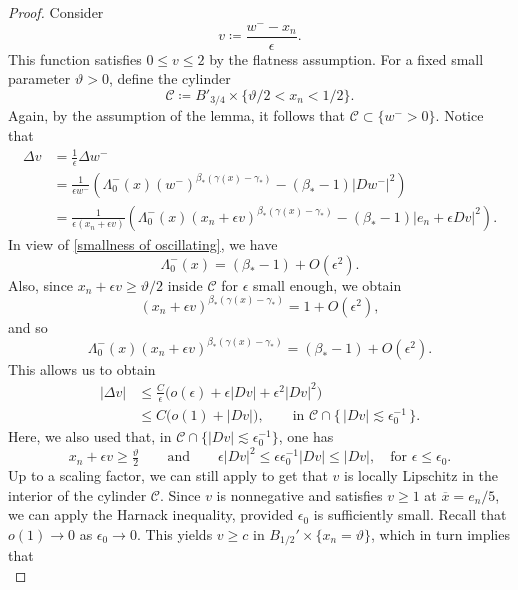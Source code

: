 \documentclass[reqno,11pt]{amsart}
\newcommand{\1}{\mathds{1}}
\numberwithin{equation}{section}
\begin{document}
\begin{proof}
Consider
$$
    v \coloneqq \frac{w^- - x_n}{\epsilon}.
$$
This function satisfies $0 \leq v \leq 2$ by the flatness assumption. For a fixed small parameter $\vartheta>0$, define the cylinder
$$
    \mathcal{C} \coloneqq B'_{3/4} \times \{\vartheta/2 < x_n < 1/2 \}.
$$
Again, by the assumption of the lemma, it follows that $\mathcal{C} \subset \{w^->0 \}$. Notice that
\begin{align*}
    \Delta v & = \frac{1}{\epsilon} \Delta w^-\\
             & = \frac{1}{\epsilon w^-}\left(\Lambda^-_{0}(x)(w^-)^{\beta_\ast(\gamma(x)-\gamma_\ast)} - (\beta_\ast - 1)|Dw^-|^2 \right)\\
             & = \frac{1}{\epsilon (x_n + \epsilon v)}\left(\Lambda^-_{0}(x)(x_n + \epsilon v)^{\beta_\ast(\gamma(x)-\gamma_\ast)} - (\beta_\ast - 1)|e_n + \epsilon Dv|^2 \right).
\end{align*}
In view of \eqref{smallness of oscillating}, we have
$$
    \Lambda_0^-(x) = (\beta_\ast - 1) + O(\epsilon^2).
$$
Also, since $x_n + \epsilon v \geq \vartheta/2$ inside $\mathcal{C}$ for $\epsilon$ small enough, we obtain
$$
    (x_n + \epsilon v)^{\beta_\ast(\gamma(x)-\gamma_\ast)} = 1+ O(\epsilon^2),
$$
and so
$$
    \Lambda^-_{0}(x)(x_n + \epsilon v)^{\beta_\ast(\gamma(x)-\gamma_\ast)} =(\beta_\ast - 1) + O(\epsilon^2).
$$
This allows us to obtain
\[
\begin{aligned}
|\Delta v|
&\leq \frac{C}{\epsilon}\Big(o(\epsilon) + \epsilon |Dv| + \epsilon^2 |Dv|^2 \Big) \\
&\leq C\big(o(1) + |Dv|\big),
\qquad \text{in } \mathcal{C} \cap \{\,|Dv| \lesssim \epsilon_0^{-1}\,\}.
\end{aligned}
\]
Here, we also used that, in $\mathcal{C} \cap \{|Dv| \lesssim \epsilon_0^{-1}\}$, one has
\[
x_n + \epsilon v \geq \tfrac{\vartheta}{2}
\qquad \text{and} \qquad 
\epsilon |Dv|^2 \leq \epsilon \epsilon_0^{-1} |Dv| \leq |Dv|,
\quad \text{for } \epsilon \leq \epsilon_0.
\] 
Up to a scaling factor, we can still apply \cite[Lemma 3.8]{DSS} to get that $v$ is locally Lipschitz in the interior of the cylinder $\mathcal{C}$. Since $v$ is nonnegative and satisfies $v \geq 1$ at $\overline{x} = e_n/5$, we can apply the Harnack inequality, provided $\epsilon_0$ is sufficiently small. Recall that $o(1) \to 0$ as $\epsilon_0 \to 0$. This yields $v \geq c$ in $B_{1/2}' \times \{x_n = \vartheta\}$, which in turn implies that 
\begin{equation}\label{bound from below harnack}

\end{equation}
\end{proof}
\end{document}
